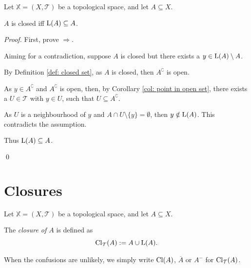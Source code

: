 \begin{theorem}
	\label{thm: closed iff contain all limit point}
	Let $\mathbb X = (X, \mathcal T)$ be a topological space, and let $A \subseteq X$.
	
	$A$ is closed iff $\mathrm{L}(A) \subseteq A$.
	
	\begin{proof}
		First, prove $\Rightarrow$.
		
		Aiming for a contradiction, suppose $A$ is closed but there exists a $y \in \mathrm{L}(A) \setminus A$.
		
		By Definition \ref{def: closed set}, as $A$ is closed, then $A^\complement$ is open.
		
		As $y \in A^\complement$ and $A^\complement$ is open, then, by Corollary \ref{col: point in open set}, there exists a $U \in \mathcal T$ with $y \in U$, such that $U \subseteq A^\complement$.
		
		As $U$ is a neighbourhood of $y$ and $A \cap U \setminus \{y\} = \emptyset$, then $y \notin \mathrm{L}(A)$. This contradicts the assumption.
		
		Thus $\mathrm{L}(A) \subseteq A$.
		
		\qed
	\end{proof}
\end{theorem}


\section{Closures}


\begin{definition}
	\label{def: closure}
	Let $\mathbb X = (X, \mathcal T)$ be a topological space, and let $A \subseteq X$.
	
	The \textit{closure of $A$} is defined as
	$$
	\mathrm{Cl}_\mathcal T(A) := A \cup \mathrm{L}(A).
	$$
	
	When the confusions are unlikely, we simply write $\mathrm{Cl}(A)$, $\overline A$ or $A^-$ for $\mathrm{Cl}_\mathcal T(A)$.
\end{definition}


